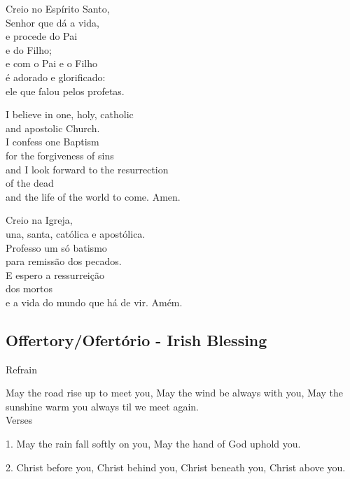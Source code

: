\documentclass[10pt,a5]{article}
\begin{document}
\begin{paracol}{2}
\switchcolumn

Creio no Espírito Santo,  \\
Senhor que dá a vida,  \\
e procede do Pai \\
e do Filho;  \\
e com o Pai e o Filho \\
é adorado e glorificado:  \\
ele que falou pelos profetas.  \\

\switchcolumn*

I believe in one, holy, catholic\\
and apostolic Church.\\
I confess one Baptism\\
for the forgiveness of sins\\
and I look forward to the resurrection\\
of the dead\\
and the life of the world to come. Amen.\\

\switchcolumn

Creio na Igreja, \\
una, santa, católica e apostólica.  \\
Professo um só batismo \\
para remissão dos pecados.  \\
E espero a ressurreição \\
dos mortos  \\
e a vida do mundo que há de vir. Amém.

\switchcolumn*

\end{paracol}

\begin{center}
\subsection*{Offertory/Ofert\'orio - Irish Blessing}
\end{center}

Refrain

May the road rise up to meet you,
May the wind be always with you,
May the sunshine warm you always
til we meet again.\\

Verses

1. May the rain fall softly on you,
May the hand of God uphold you.

2. Christ before you, Christ behind you,
Christ beneath you, Christ above you.
\end{document}

